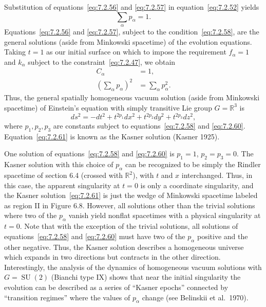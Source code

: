 Substitution of equations~\eqref{eq:7.2.56} and \eqref{eq:7.2.57} in
equation~\eqref{eq:7.2.52} yields
\begin{equation}
  \sum_\alpha p_\alpha=1 .
  \tag{7.2.58}\label{eq:7.2.58}
\end{equation}
Equations~\eqref{eq:7.2.56} and \eqref{eq:7.2.57}, subject to the
condition~\eqref{eq:7.2.58}, are the general solutions (aside from Minkowski
spacetime) of the evolution equations. Taking \(t=1\) as our initial surface on
which to impose the requirement \(f_\alpha=1\) and \(k_\alpha\) subject to the
constraint~\eqref{eq:7.2.47}, we obtain
\begin{align}
  C_\alpha&=1 ,
  \tag{7.2.59}\label{eq:7.2.59}\\
  \left(\sum_\alpha p_\alpha\right)^2
    &=\sum_\alpha p_\alpha^2 .
  \tag{7.2.60}\label{eq:7.2.60}
\end{align}
Thus, the general spatially homogeneous vacuum solution (aside from Minkowski
spacetime) of Einstein's equation with simply transitive Lie group
\(G=\mathbb R^3\) is
\begin{equation}
  ds^2=-dt^2+t^{2p_1}dx^2+t^{2p_2}dy^2+t^{2p_3}dz^2 ,
  \tag{7.2.61}\label{eq:7.2.61}
\end{equation}
where \(p_1,p_2,p_3\) are constants subject to equations~\eqref{eq:7.2.58} and
\eqref{eq:7.2.60}. Equation~\eqref{eq:7.2.61} is known as the Kasner solution
(Kasner 1925).

One solution of equations~\eqref{eq:7.2.58} and \eqref{eq:7.2.60} is
\(p_1=1\), \(p_2=p_3=0\). The Kasner solution with this choice of \(p_\alpha\)
can be recognized to be simply the Rindler spacetime of section 6.4 (crossed with
\(\mathbb R^2\)), with \(t\) and \(x\) interchanged. Thus, in this case, the
apparent singularity at \(t=0\) is only a coordinate singularity, and the Kasner
solution~\eqref{eq:7.2.61} is just the wedge of Minkowski spacetime labeled as
region II in Figure 6.8. However, all solutions other than the trivial solutions where
two of the \(p_\alpha\) vanish yield nonflat spacetimes with a physical singularity
at \(t=0\). Note that with the exception of the trivial solutions, all solutions of
equations~\eqref{eq:7.2.58} and \eqref{eq:7.2.60} must have two of the
\(p_\alpha\) positive and the other negative. Thus, the Kasner solution describes
a homogeneous universe which expands in two directions but contracts in the other
direction. Interestingly, the analysis of the dynamics of homogeneous vacuum
solutions with \(G=\operatorname{SU}(2)\) (Bianchi type IX) shows that near the
initial singularity the evolution can be described as a series of “Kasner epochs”
connected by “transition regimes” where the values of \(p_\alpha\) change (see
Belinskii et al.\ 1970).

